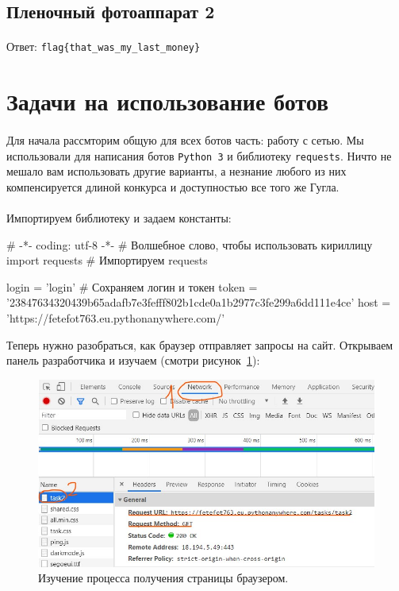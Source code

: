 \documentclass[12pt]{article}
\begin{document}
    \subsection{Пленочный фотоаппарат 2}
    \paragraph{}
    \paragraph{}
    Ответ: \verb|flag{that_was_my_last_money}|

    \newpage

    \section{Задачи на использование ботов}
	\paragraph{}
    Для начала рассмторим общую для всех ботов часть: работу с сетью.
	Мы использовали для написания ботов \verb|Python 3| и библиотеку \verb|requests|.
	Ничто не мешало вам использовать другие варианты,
	а незнание любого из них компенсируется длиной конкурса и доступностью все того же Гугла.
	\paragraph{}
    Импортируем библиотеку и задаем константы:
    \begin{pythoncode}
# -*- coding: utf-8 -*- # Волшебное слово, чтобы использовать кириллицу
import requests # Импортируем requests

login = 'login' # Сохраняем логин и токен
token = '23847634320439b65adafb7e3fefff802b1cde0a1b2977c3fe299a6dd111e4ce'
host = 'https://fetefot763.eu.pythonanywhere.com/'
    \end{pythoncode}

    Теперь нужно разобраться, как браузер отправляет запросы на сайт.
    Открываем панель разработчика и изучаем (смотри рисунок~\ref{fig:browser1}):
    \begin{figure}[H]
        \includegraphics[width=\linewidth]{BrowserNetworkAnalysis0}
        \caption{Изучение процесса получения страницы браузером.}
        \label{fig:browser1}
    \end{figure}
\end{document}
